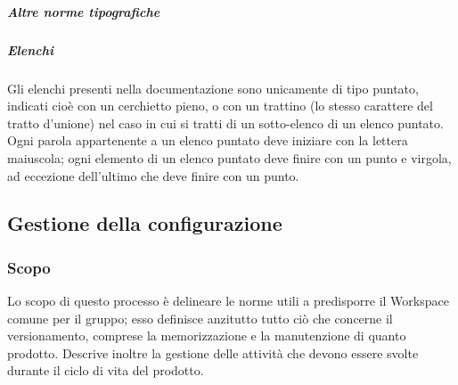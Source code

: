 \documentclass[../norme-di-progetto.tex]{subfiles}
\begin{document}
\subparagraph{Altre norme tipografiche}
\subparagraph*{Elenchi}
Gli elenchi presenti nella documentazione sono unicamente di tipo puntato, indicati cioè con un cerchietto pieno, o con un trattino (lo stesso carattere del tratto d'unione) nel caso in cui si tratti di un sotto-elenco di un elenco puntato. \\
Ogni parola appartenente a un elenco puntato deve iniziare con la lettera maiuscola; ogni elemento di un elenco puntato deve finire con un punto e virgola, ad eccezione dell'ultimo che deve finire con un punto.

\subsection{Gestione della configurazione}
\subsubsection{Scopo}
Lo scopo di questo processo è delineare le norme utili a predisporre il Workspace comune per il gruppo; esso definisce anzitutto tutto ciò che concerne il versionamento, comprese la memorizzazione e la manutenzione di quanto prodotto. Descrive inoltre la gestione delle attività che devono essere svolte durante il ciclo di vita del prodotto.
\end{document}
